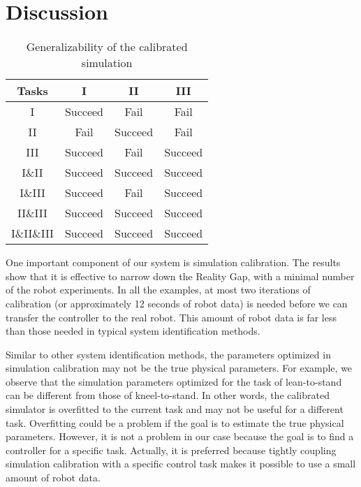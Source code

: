 \section{Discussion}
\begin{table}
  \caption{Generalizability of the calibrated simulation}
  \vspace{-0.1in}
 \label{table:generalize}
\begin{center}
\begin{tabular}{|c|c|c|c|}
\hline
 Tasks &  I &  II  &  III \\
 \hline
 I & Succeed & Fail & Fail  \\
 II & Fail & Succeed & Fail \\
 III & Succeed & Fail & Succeed \\
 I\&II & Succeed & Succeed & Succeed\\
 I\&III & Succeed & Fail & Succeed\\
 II\&III & Succeed & Succeed & Succeed \\
 I\&II\&III & Succeed & Succeed & Succeed\\
\hline
\end{tabular}
\vspace{-0.2in}
\end{center}
 \end{table}


One important component of our system is simulation calibration. The results show that it is effective to narrow down the Reality Gap, with a minimal number of the robot experiments. In all the examples, at most two iterations of calibration (or approximately 12 seconds of robot data) is needed before we can transfer the controller to the real robot. This amount of robot data is far less than those needed in typical system identification methods.

Similar to other system identification methods, the parameters optimized in simulation calibration may not be the true physical parameters. For example, we observe that the simulation parameters optimized for the task of lean-to-stand can be different from those of kneel-to-stand. In other words, the calibrated simulator is overfitted to the current task and may not be useful for a different task. Overfitting could be a problem if the goal is to estimate the true physical parameters. However, it is not a problem in our case because the goal is to find a controller for a specific task. Actually, it is preferred because tightly coupling simulation calibration with a specific control task makes it possible to use a small amount of robot data.

